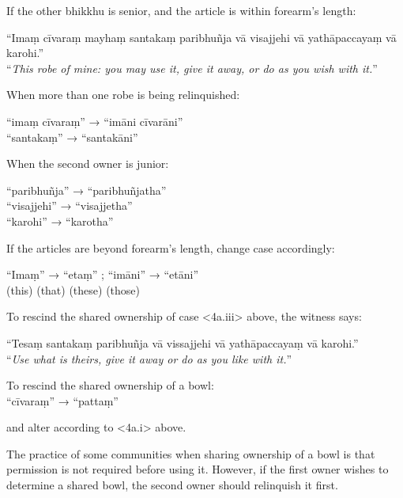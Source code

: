If the other bhikkhu is senior, and the article is within forearm’s length:

“Imaṃ cīvaraṃ mayhaṃ santakaṃ paribhuñja vā visajjehi vā yathāpaccayaṃ vā karohi.”\\
“\emph{This robe of mine: you may use it, give it away, or do as you wish with it.}”


When more than one robe is being relinquished:

“imaṃ cīvaraṃ” → “imāni cīvarāni”\\
“santakaṃ” → “santakāni”

When the second owner is junior:

“paribhuñja” → “paribhuñjatha”\\
“visajjehi” → “visajjetha”\\
“karohi” → “karotha”

If the articles are beyond forearm's length, change case accordingly:

“Imaṃ” → “etaṃ” ; “imāni” → “etāni”\\
(this) (that) (these) (those)


To rescind the shared ownership of case <4a.iii> above, the witness says:

“Tesaṃ santakaṃ paribhuñja vā vissajjehi vā yathāpaccayaṃ vā karohi.”\\
“\emph{Use what is theirs, give it away or do as you like with it.}”

To rescind the shared ownership of a bowl:\\
“cīvaraṃ” → “pattaṃ”


and alter according to <4a.i> above.

The practice of some communities when sharing ownership of a bowl is that
permission is not required before using it. However, if the first owner wishes
to determine a shared bowl, the second owner should relinquish it first.


